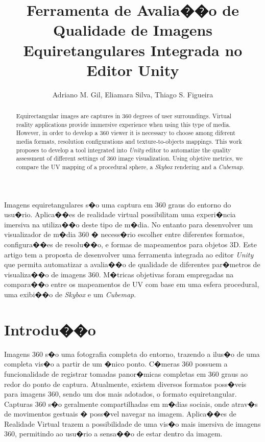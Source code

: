 \documentclass[12pt]{article}
\title{Ferramenta de Avalia��o de Qualidade de Imagens Equiretangulares Integrada no Editor Unity}
\author{Adriano M. Gil\inst{1}, Eliamara Silva\inst{1}, Thiago S. Figueira\inst{1}}
\begin{document}
\maketitle

\begin{abstract}
  Equirectangular images are captures in 360 degrees of user surroundings. Virtual reality applications provide immersive experience when using this type of media. However, in order to develop a 360 viewer it is necessary to choose among diferent media formats, resolution configurations and texture-to-objects mappings. This work proposes to develop a tool integrated into \textit{Unity} editor to automatize the quality assessment of different settings of 360 image visualization. Using objetive metrics, we compare the UV mapping of a procedural sphere, a \textit{Skybox} rendering and a \textit{Cubemap}.
\end{abstract}

\begin{resumo}
  Imagens equiretangulares s�o uma captura em 360 graus do entorno do usu�rio. Aplica��es de realidade virtual possibilitam uma experi�ncia imersiva na utiliza��o deste tipo de m�dia. No entanto para desenvolver um visualizador de m�dia 360 � necess�rio escolher entre diferentes formatos, configura��es de resolu��o, e formas de mapeamentos para objetos 3D. Este artigo tem a proposta de desenvolver uma ferramenta integrada ao editor \textit{Unity} que permita automatizar a avalia��o de qualidade de diferentes par�metros de visualiza��o de imagens 360. M�tricas objetivas foram empregadas na compara��o entre os mapeamentos de UV com base em uma esfera procedural, uma exibi��o de \textit{Skybox} e um \textit{Cubemap}.
\end{resumo}

\section{Introdu��o}

Imagens 360 s�o uma fotografia completa do entorno, trazendo a ilus�o de uma completa vis�o a partir de um �nico ponto. C�meras 360 possuem a funcionalidade de registrar tomadas panor�micas completas em 360 graus ao redor do ponto de captura. Atualmente, existem diversos formatos poss�veis para imagens 360, sendo um dos mais adotados, o formato equiretangular. Capturas 360 s�o geralmente compartilhadas em m�dias sociais, onde atrav�s de movimentos gestuais � poss�vel navegar na imagem. Aplica��es de Realidade Virtual trazem a possibilidade de uma vis�o mais imersiva de imagens 360, permitindo ao usu�rio a sensa��o de estar dentro da imagem.
\end{document}
